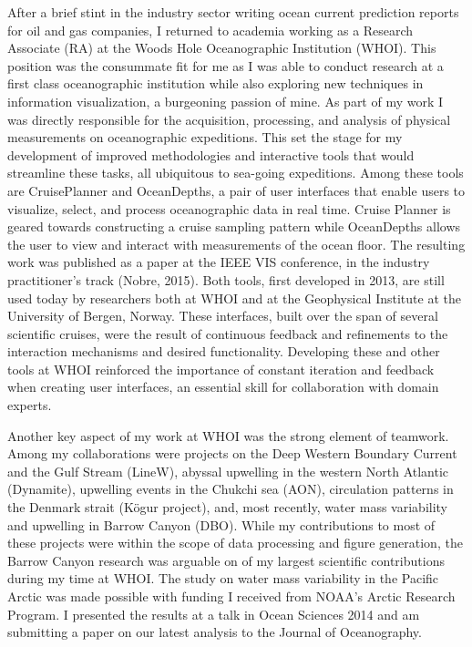\documentclass[timesfont,runinheadings]{nsfgrfp}
\begin{document}
After a brief stint in the industry sector writing ocean current prediction reports for oil and gas companies, I returned to academia working as a Research Associate (RA) at the Woods Hole Oceanographic Institution (WHOI). This position was the consummate fit for me as I was able to conduct research at a first class oceanographic institution while also exploring new techniques in information visualization, a burgeoning passion of mine. As part of my work I was directly responsible for the acquisition, processing, and analysis of physical measurements on oceanographic expeditions. This set the stage for my development of improved methodologies and interactive tools that would streamline these tasks, all ubiquitous to sea-going expeditions. Among these tools are CruisePlanner and OceanDepths, a pair of user interfaces that enable users to visualize, select, and process oceanographic data in real time. Cruise Planner is geared towards constructing a cruise sampling pattern while OceanDepths allows the user to view and interact with measurements of the ocean floor.  The resulting work was published as a paper at the IEEE VIS conference, in the industry practitioner’s track (Nobre, 2015). Both tools, first developed in 2013, are still used today by researchers both at WHOI and at the Geophysical Institute at the University of Bergen, Norway. These interfaces, built over the span of several scientific cruises, were the result of continuous feedback and refinements to the interaction mechanisms and desired functionality. Developing these and other tools at WHOI reinforced the importance of constant iteration and feedback when creating user interfaces, an essential skill for collaboration with domain experts.   

Another key aspect of my work at WHOI was the strong element of teamwork. Among my collaborations were projects on the Deep Western Boundary Current and the Gulf Stream (LineW), abyssal upwelling in the western North Atlantic (Dynamite), upwelling events  in the Chukchi sea  (AON), circulation patterns  in the Denmark strait  (K\"ogur project), and, most recently, water mass variability and upwelling in Barrow Canyon (DBO). While my contributions to most of these projects were within the scope of data processing and figure generation, the Barrow Canyon research was arguable on of my largest scientific contributions during my time at WHOI.  The study on water mass variability in the Pacific Arctic was made possible with funding I received from NOAA’s Arctic Research Program. I presented the results at a talk in Ocean Sciences 2014 and am submitting a paper on our latest analysis to the Journal of Oceanography.  
\end{document}
